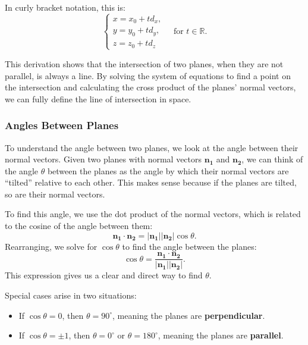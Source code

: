 \begin{enumerate}
    \noindent In curly bracket notation, this is:
    \[
    \left\{
    \begin{array}{l}
        x = x_0 + t d_x, \\
        y = y_0 + t d_y, \\
        z = z_0 + t d_z
    \end{array}
    \right. \quad \text{for } t \in \mathbb{R}.
    \]
\end{enumerate}

\noindent This derivation shows that the intersection of two planes, when they are not parallel, is always a line. By solving the system of equations to find a point on the intersection and calculating the cross product of the planes' normal vectors, we can fully define the line of intersection in space.





\subsubsection*{Angles Between Planes}

\noindent To understand the angle between two planes, we look at the angle between their normal vectors. Given two planes with normal vectors \( \mathbf{n_1} \) and \( \mathbf{n_2} \), we can think of the angle \( \theta \) between the planes as the angle by which their normal vectors are “tilted” relative to each other. This makes sense because if the planes are tilted, so are their normal vectors.

\noindent To find this angle, we use the dot product of the normal vectors, which is related to the cosine of the angle between them:
\[
\mathbf{n_1} \cdot \mathbf{n_2} = |\mathbf{n_1}| |\mathbf{n_2}| \cos \theta.
\]
Rearranging, we solve for \( \cos \theta \) to find the angle between the planes:
\[
\cos \theta = \frac{\mathbf{n_1} \cdot \mathbf{n_2}}{|\mathbf{n_1}| |\mathbf{n_2}|}.
\]
This expression gives us a clear and direct way to find \( \theta \).

\noindent Special cases arise in two situations:
\begin{itemize}
    \item If \( \cos \theta = 0 \), then \( \theta = 90^\circ \), meaning the planes are \textbf{perpendicular}.
    \item If \( \cos \theta = \pm 1 \), then \( \theta = 0^\circ \) or \( \theta = 180^\circ \), meaning the planes are \textbf{parallel}.
\end{itemize}

